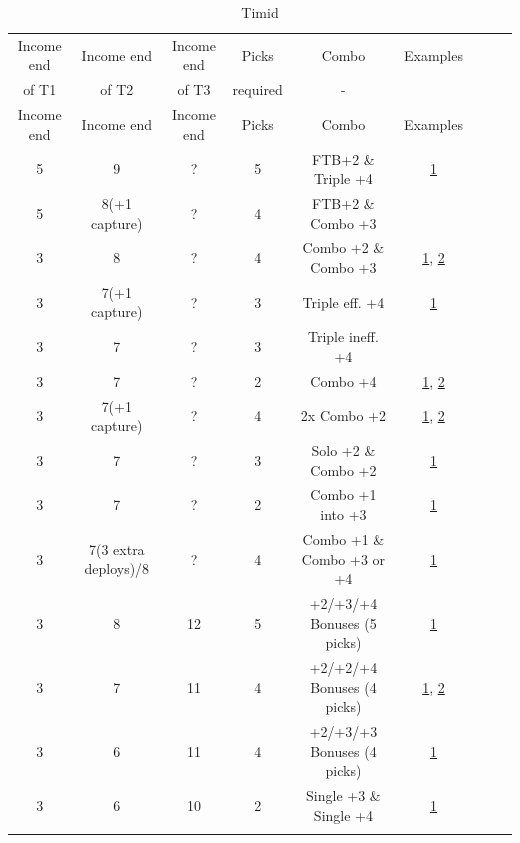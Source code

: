 \small
\begin{longtable}{|c|c|c|c|c|c|c|c|c|}
\hline
\rowcolor{Baby_Blue}
Income end & Income end & Income end & Picks & Combo & Examples \\ 
\rowcolor{Baby_Blue}
of T1 & of T2 & of T3 & required & - & \\ \hline\hline
\endfirsthead
\hline
\rowcolor{Baby_Blue}
Income end & Income end & Income end & Picks & Combo & Examples \\  \hline\hline
\endhead
5 & 9 & ? & 5 & FTB+2 \& Triple +4 & \href{https://www.warzone.com/MultiPlayer?GameID=40418180}{1} \\ \hline
5 & 8(+1 capture) & ? & 4 & FTB+2 \& Combo +3 & \\
3 & 8 & ? & 4 & Combo +2 \& Combo +3 & \href{https://www.warzone.com/MultiPlayer?GameID=38715533}{1}, \href{https://www.warzone.com/MultiPlayer?GameID=39181292}{2} \\ \hline
3 & 7(+1 capture) & ? & 3 & Triple eff. +4 & \href{https://www.warzone.com/MultiPlayer?GameID=38715533}{1} \\
3 & 7 & ? & 3 & Triple ineff. +4 & \\
3 & 7 & ? & 2 & Combo +4 & \href{https://www.warzone.com/MultiPlayer?GameID=34576895}{1}, \href{https://www.warzone.com/MultiPlayer?GameID=34153635}{2} \\
3 & 7(+1 capture) & ? & 4 & 2x Combo +2 & \href{https://www.warzone.com/MultiPlayer?GameID=38970219}{1}, \href{https://www.warzone.com/MultiPlayer?GameID=32895186}{2} \\
3 & 7 & ? & 3 & Solo +2 \& Combo +2 & \href{https://www.warzone.com/MultiPlayer?GameID=36379095}{1} \\ 
3 & 7 & ? & 2 & Combo +1 into +3 & \href{https://www.warzone.com/MultiPlayer?GameID=40990036}{1} \\
3 & 7(3 extra deploys)/8 & ? & 4 & Combo +1 \& Combo +3 or +4 & \href{https://www.warzone.com/MultiPlayer?GameID=40757482}{1} \\

\hline
3 & 8 & 12 & 5 & +2/+3/+4 Bonuses (5 picks) & \href{https://www.warzone.com/MultiPlayer?GameID=18635738}{1} \\
3 & 7 & 11 & 4 & +2/+2/+4 Bonuses (4 picks) & \href{https://www.warzone.com/MultiPlayer?GameID=30374375}{1}, \href{https://www.warzone.com/MultiPlayer?GameID=37911548}{2} \\
3 & 6 & 11 & 4 & +2/+3/+3 Bonuses (4 picks) & \href{https://www.warzone.com/MultiPlayer?GameID=18786878}{1} \\
3 & 6 & 10 & 2 & Single +3 \& Single +4 & \href{https://www.warzone.com/MultiPlayer?GameID=33428381}{1} \\



\hline
\caption{Timid}
\label{timid_income}
\end{longtable}
\normalsize

